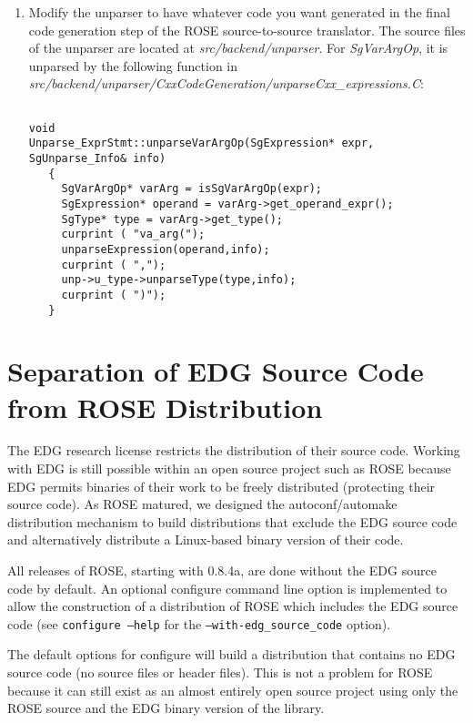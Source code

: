 \begin{enumerate}
{{\begin{verbatim}
}
\end{verbatim} 
}}

     \item Modify the unparser to have whatever code you want generated in the final
           code generation step of the ROSE source-to-source translator.
           The source files of the unparser are located at
           \textit{src/backend/unparser}. For {\em SgVarArgOp}, it is
           unparsed by the following function in
           \textit{src/backend/unparser/CxxCodeGeneration/unparseCxx\_expressions.C}:

{\indent
{\mySmallFontSize
\begin{verbatim}

void
Unparse_ExprStmt::unparseVarArgOp(SgExpression* expr, SgUnparse_Info& info)
   {
     SgVarArgOp* varArg = isSgVarArgOp(expr);
     SgExpression* operand = varArg->get_operand_expr();
     SgType* type = varArg->get_type();
     curprint ( "va_arg(");
     unparseExpression(operand,info);
     curprint ( ",");
     unp->u_type->unparseType(type,info);
     curprint ( ")");
   }
\end{verbatim} 
}}



\end{enumerate}



\section{Separation of EDG Source Code from ROSE Distribution}

    The EDG research license restricts the distribution of their source code.
Working with EDG is still possible within an open source project such as ROSE because 
EDG permits binaries of their work to be freely distributed (protecting their source 
code).  As ROSE matured, we designed the autoconf/automake distribution mechanism
to build distributions that exclude the EDG source code and alternatively distribute
a Linux-based binary version of their code.

   All releases of ROSE, starting with 0.8.4a, are done without the EDG source code
by default.  An optional configure command line option is implemented to allow
the construction of a distribution of ROSE which includes the EDG source code
(see {\tt configure --help} for the {\tt --with-edg\_source\_code} option).

   The default options for configure will build a distribution that contains
no EDG source code (no source files or header files).  This is not a problem 
for ROSE because it can still exist as an almost entirely open source project
using only the ROSE source and the EDG binary version of the library.

